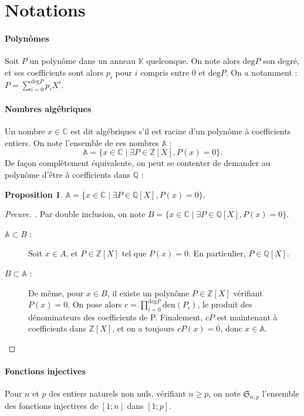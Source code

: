 \documentclass[11pt,a4paper,draft]{article}
\newcounter{cprop}[section]
\newtheorem{prop}[cprop]{Proposition}
\begin{document}
\section{Notations}

\paragraph{Polynômes}
Soit $P$ un polynôme dans un anneau $\mathbb{K}$ quelconque. On note alors $\text{deg} P$ son degré, et ses coefficients sont alors $p_i$ pour $i$ compris entre $0$ et $\text{deg} P$. On a notamment : $P = \sum\limits_{i = 0}^{\text{deg} P} p_i X^i$.

\paragraph{Nombres algébriques}
Un nombre $x \in \mathbb{C}$ est dit algébriques s'il est racine d'un polynôme à coefficients entiers. On note l'ensemble de ces nombres $\mathbb{A}$ :
$$\mathbb{A} = \{ x \in \mathbb{C} \mid \exists P \in \mathbb{Z}[X], P(x) = 0\}.$$
De façon complètement équivalente, on peut se contenter de demander au polynôme d'être à coefficients dans $\mathbb{Q}$ :

\begin{prop}
$\mathbb{A} = \{ x \in \mathbb{C} \mid \exists P \in \mathbb{Q}[X], P(x) = 0\}.$
\end{prop}

\begin{proof}[Preuve. ]
Par double inclusion, on note $B = \{ x \in \mathbb{C} \mid \exists P \in \mathbb{Q}[X], P(x) = 0\}$.
\begin{description}
\item[$\mathbb{A} \subset B$ :] Soit $x \in A$, et $P \in \mathbb{Z}[X]$ tel que $P(x) = 0$. En particulier, $P \in \mathbb{Q}[X]$.
\item[$B \subset \mathbb{A}$ :] De même, pour $x \in B$, il existe un polynôme $P \in \mathbb{Z}[X]$ vérifiant $P(x) = 0$. On pose alors $c = \prod_{i = 0}^{\text{deg} P} \text{den}(P_i)$, le produit des dénominateurs des coefficients de P. Finalement, $cP$ est maintenant à coefficients dans $\mathbb{Z}[X]$, et on a toujours $cP (x) = 0$, donc $x \in \mathbb{A}$.
\end{description}
\end{proof}

\paragraph{Fonctions injectives}
Pour $n$ et $p$ des entiers naturels non nuls, vérifiant $n \geq p$, on note $\mathfrak{S}_{n,p}$ l'ensemble des fonctions injectives de $[1; n]$ dans $[1; p]$.
\end{document}

